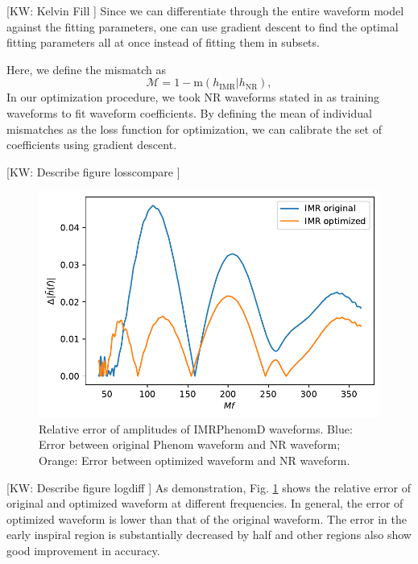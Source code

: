 \documentclass[twocolumn]{aastex631}
\newcommand{\kw}[1]{{\color{rb4}[KW: #1 ]}}
\begin{document}
\kw{Kelvin Fill}
Since we can differentiate through the entire waveform model against the fitting
parameters, one can use gradient descent to find the optimal fitting parameters
all at once instead of fitting them in subsets.

Here, we define the mismatch as
\begin{equation}
	\mathcal{M}=1-\mathrm{m}(h_{\mathrm{IMR}}|h_{\mathrm{NR}}), 
\end{equation} 
In our optimization procedure, we took NR waveforms stated in \citep{Khan:2015jqa} as training waveforms to fit waveform coefficients. 
By defining the mean of individual mismatches as the loss function for optimization, we can calibrate the set of coefficients using gradient descent. 

\kw{Describe figure losscompare}

\begin{figure}[t]
\centering
\includegraphics[width=\linewidth]{../static/amplitude_loss.pdf}
\caption{Relative error of amplitudes of IMRPhenomD waveforms. Blue: Error
    between original Phenom waveform and NR waveform; Orange: Error between
    optimized waveform and NR waveform. }
\label{fig:loss_compare}
\end{figure}

\kw{Describe figure logdiff}
As demonstration, Fig. \ref{fig:loss_compare} shows the relative error of original and optimized waveform at different frequencies. 
In general, the error of optimized waveform is lower than that of the original waveform. 
The error in the early inspiral region is substantially decreased by half and other regions also show good improvement in accuracy.   
\end{document}
